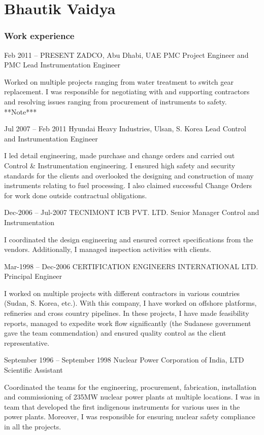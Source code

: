 \documentclass{tccv}
\begin{document}
\part{Bhautik Vaidya}

\section{Work experience}

\begin{eventlist}

\item{Feb 2011 -- PRESENT}
     {ZADCO, Abu Dhabi, UAE}
     {PMC Project Engineer and PMC Lead Instrumentation Engineer}

Worked on multiple projects ranging from water treatment to switch gear replacement. I was responsible for negotiating with and supporting contractors and resolving issues ranging from procurement of instruments to safety. **Note***

\item{Jul 2007 -- Feb 2011}
     {Hyundai Heavy Industries, Ulsan, S. Korea}
     {Lead Control and Instrumentation Engineer}

I led detail engineering, made purchase and change orders and carried out Control & Instrumentation engineering. I ensured high safety and security standards for the clients and overlooked the designing and construction of many instruments relating to fuel processing. I also claimed successful Change Orders for work done outside contractual obligations.

\item{Dec-2006 -- Jul-2007}
     {TECNIMONT ICB PVT. LTD.}
     {Senior Manager Control and Instrumentation}

I coordinated the design engineering and ensured correct specifications from the vendors. Additionally, I managed inspection activities with clients. 

\item{Mar-1998 -- Dec-2006}
     {
CERTIFICATION ENGINEERS INTERNATIONAL LTD.}
     {Principal Engineer}

I worked on multiple projects with different contractors in various countries (Sudan, S. Korea, etc.). With this company, I have worked on offshore platforms, refineries and cross country pipelines. In these projects, I have made feasibility reports, managed to expedite work flow significantly (the Sudanese government gave the team commendation) and ensured quality control as the client representative. 

\item{September 1996 -- September 1998}
     {Nuclear Power Corporation of India, LTD}
     {Scientific Assistant}

Coordinated the teams for the engineering, procurement, fabrication, installation and commissioning of 235MW nuclear power plants at multiple locations. I was in team that developed the first indigenous instruments for various uses in the power plants. Moreover, I was responsible for ensuring nuclear safety compliance in all the projects.  

\end{eventlist}
\end{document}
